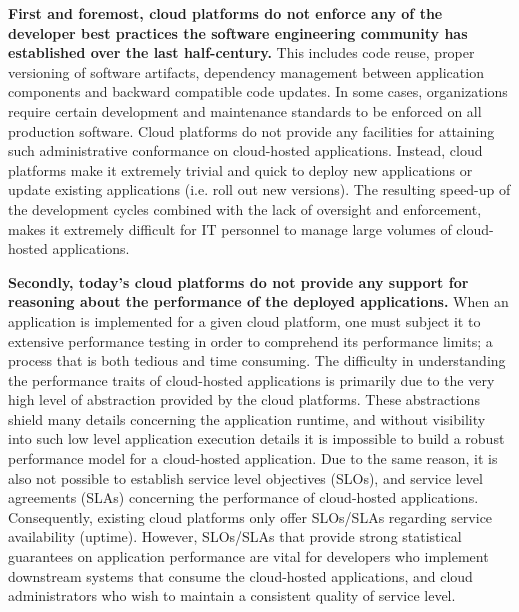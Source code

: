 \textbf{First and foremost, cloud platforms do not enforce any of the developer best practices
the software engineering community has established over the last half-century.} This
includes code reuse, proper versioning of software artifacts, dependency management
between application components and backward compatible code updates. In
some cases, organizations require certain development and maintenance standards to be enforced on
all production software. Cloud platforms do not provide any facilities for attaining
such administrative conformance on cloud-hosted applications. Instead, cloud platforms
make it extremely trivial and quick to deploy new applications or update existing
applications (i.e. roll out new versions). The resulting speed-up of the development cycles combined with the lack of 
oversight and enforcement, makes it extremely difficult for 
IT personnel to manage large volumes of cloud-hosted applications.

\textbf{Secondly, today's cloud platforms do not provide any support for reasoning about the 
performance of the deployed applications.} When an application is implemented for
a given cloud platform, one must subject it to extensive performance testing in order
to comprehend its performance limits; a process that is both 
tedious and time consuming. The difficulty in understanding the performance 
traits of cloud-hosted applications is primarily due to the very high level of 
abstraction provided by the cloud platforms. These abstractions shield many details 
concerning the application runtime, and without visibility into such low level application 
execution details it is impossible
to build a robust performance model for a cloud-hosted application. Due to the same
reason, it is also not possible to establish service level objectives (SLOs), and 
service level agreements (SLAs) concerning
the performance of cloud-hosted applications. 
Consequently, existing cloud platforms only offer SLOs/SLAs regarding service availability (uptime).
However, SLOs/SLAs that provide strong
statistical guarantees on application performance are vital for developers 
who implement downstream systems that consume the cloud-hosted applications,
and cloud administrators who wish to maintain a consistent quality of service
level.

